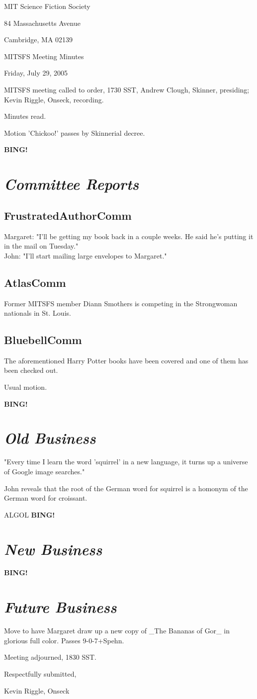 \documentclass[10pt]{article}
\newcommand{\bing}{{\bf BING!} }
\newcommand{\goto}[1]{\bing \vskip 12pt \section*{{\em{#1}}}}
\begin{document}
\begin{center}

MIT Science Fiction Society

84 Massachusetts Avenue

Cambridge, MA 02139

\vspace{12pt}

MITSFS Meeting Minutes

Friday, July 29, 2005

\end{center}

\vspace{18pt}

\setlength{\parskip}{6pt}

\noindent
MITSFS meeting called to order, 1730 SST, Andrew Clough, 
Skinner, presiding; Kevin Riggle,  Onseck, recording.

Minutes read.

Motion 'Chickoo!' passes by Skinnerial decree.

\goto{Committee Reports}
\subsection*{FrustratedAuthorComm}
Margaret: "I'll be getting my book back in a couple weeks.  He said he's putting it in the mail on Tuesday."\\
John: "I'll start mailing large envelopes to Margaret."

\subsection*{AtlasComm}

Former MITSFS member Diann Smothers is competing in the Strongwoman nationals in St. Louis.

\subsection*{BluebellComm}

The aforementioned Harry Potter books have been covered and one of them has been checked out.

Usual motion.

\goto{Old Business}

"Every time I learn the word 'squirrel' in a new language, it turns up a universe of Google image searches."

John reveals that the root of the German word for squirrel is a homonym of the German word for croissant.

ALGOL
\goto{New Business}

\goto{Future Business}

Move to have Margaret draw up a new copy of _The Bananas of Gor_ in glorious full color.  Passes 9-0-7+Spehn.

\vspace{12pt}

\noindent
Meeting adjourned, 1830 SST.

\vspace{18pt}

\centerline{Respectfully submitted,}
\centerline{Kevin Riggle, Onseck}
\end{document}
